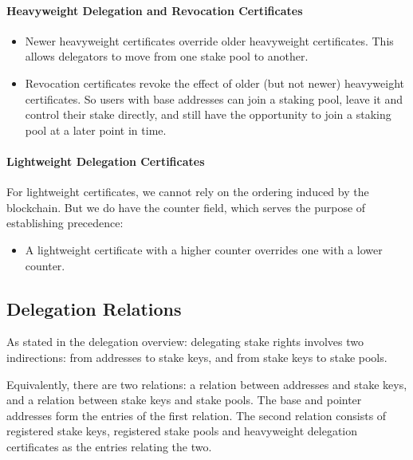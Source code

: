 \documentclass[11pt,a4paper]{article}
\begin{document}
\paragraph{Heavyweight Delegation and Revocation Certificates}
\label{heavyweight-delegation-and-revocation-certificates}

\begin{itemize}
\item
  Newer heavyweight certificates override older heavyweight
  certificates. This allows delegators to move from one stake pool to
  another.
\item
  Revocation certificates revoke the effect of older (but not newer)
  heavyweight certificates. So users with base addresses can join a
  staking pool, leave it and control their stake directly, and still
  have the opportunity to join a staking pool at a later point in time.
\end{itemize}

\paragraph{Lightweight Delegation Certificates}
\label{lightweight-delegation-certificates-1}

For lightweight certificates, we cannot rely on the ordering induced by
the blockchain. But we do have the counter field, which serves the
purpose of establishing precedence:

\begin{itemize}
\item
  A lightweight certificate with a higher counter overrides one with a
  lower counter.
\end{itemize}

\subsection{Delegation Relations}
\label{delegation-relations}

As stated in the delegation overview: delegating stake rights involves
two indirections: from addresses to stake keys, and from stake keys to
stake pools.

Equivalently, there are two relations: a relation between addresses and
stake keys, and a relation between stake keys and stake pools. The base
and pointer addresses form the entries of the first relation. The second
relation consists of registered stake keys, registered stake pools and
heavyweight delegation certificates as the entries relating the two.
\end{document}
